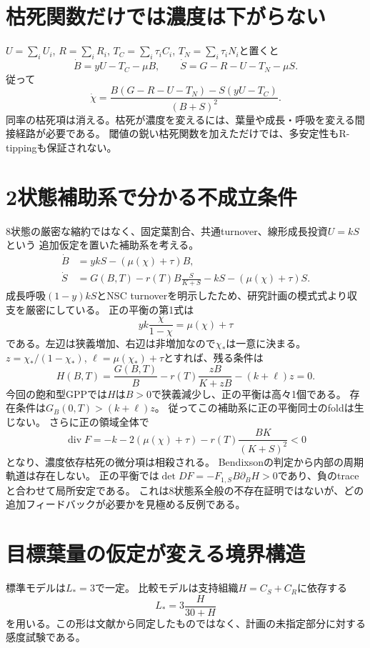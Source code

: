\documentclass[a4paper,11pt]{ltjsarticle}
\begin{document}
\section{枯死関数だけでは濃度は下がらない}
$U=\sum_i U_i$, $R=\sum_iR_i$, $T_C=\sum_i\tau_i C_i$, $T_N=\sum_i\tau_iN_i$と置くと
\begin{equation}
\dot B=yU-T_C-\mu B,\qquad
\dot S=G-R-U-T_N-\mu S.
\end{equation}
従って
\begin{equation}
\dot\chi=\frac{B(G-R-U-T_N)-S(yU-T_C)}{(B+S)^2}.
\end{equation}
同率の枯死項は消える。枯死が濃度を変えるには、葉量や成長・呼吸を変える間接経路が必要である。
閾値の鋭い枯死関数を加えただけでは、多安定性もR-tippingも保証されない。

\section{2状態補助系で分かる不成立条件}
8状態の厳密な縮約ではなく、固定葉割合、共通turnover、線形成長投資$U=kS$という
追加仮定を置いた補助系を考える。
\begin{align}
\dot B&=ykS-(\mu(\chi)+\tau)B,\\
\dot S&=G(B,T)-r(T)B\frac{S}{K+S}-kS-(\mu(\chi)+\tau)S.
\end{align}
成長呼吸$(1-y)kS$とNSC turnoverを明示したため、研究計画の模式式より収支を厳密にしている。
正の平衡の第1式は
\begin{equation}
yk\frac{\chi}{1-\chi}=\mu(\chi)+\tau
\end{equation}
である。左辺は狭義増加、右辺は非増加なので$\chi_*$は一意に決まる。
$z=\chi_*/(1-\chi_*)$, $\ell=\mu(\chi_*)+\tau$とすれば、残る条件は
\begin{equation}
H(B,T)=\frac{G(B,T)}{B}-r(T)\frac{zB}{K+zB}-(k+\ell)z=0.
\end{equation}
今回の飽和型GPPでは$H$は$B>0$で狭義減少し、正の平衡は高々1個である。
存在条件は$G_B(0,T)>(k+\ell)z$。
従ってこの補助系に正の平衡同士のfoldは生じない。
さらに正の領域全体で
\begin{equation}
\operatorname{div}F=-k-2(\mu(\chi)+\tau)
 -r(T)\frac{BK}{(K+S)^2}<0
\end{equation}
となり、濃度依存枯死の微分項は相殺される。
Bendixsonの判定から内部の周期軌道は存在しない。
正の平衡では$\det DF=-F_{1,S}B\partial_BH>0$であり、負のtraceと合わせて局所安定である。
これは8状態系全般の不存在証明ではないが、どの追加フィードバックが必要かを見極める反例である。

\section{目標葉量の仮定が変える境界構造}
標準モデルは$L_*=3$で一定。
比較モデルは支持組織$H=C_S+C_R$に依存する
\begin{equation}
L_*=3\frac{H}{30+H}
\end{equation}
を用いる。この形は文献から同定したものではなく、計画の未指定部分に対する感度試験である。
\end{document}
